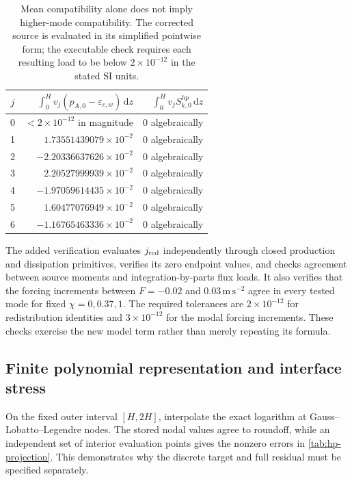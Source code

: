\documentclass[11pt,a4paper]{article}
\numberwithin{equation}{section}
\newcommand{\dd}{\mathrm{d}}
\newcommand{\eps}{\varepsilon}
\newcommand{\units}[1]{\,\mathrm{#1}}
\newcommand{\ECw}{\eps_{c,w}}
\begin{document}
\begin{table}[htbp]
\centering\small
\begin{tabular}{@{}crr@{}}
\toprule
$j$ & $\int_0^H v_j(p_{A,0}-\ECw)\,\dd z$
& $\int_0^H v_j S_{k,0}^{hp}\,\dd z$\\
\midrule
0 & $<2\times10^{-12}$ in magnitude & $0$ algebraically\\
1 & $ 1.73551439079\times10^{-2}$ & $0$ algebraically\\
2 & $-2.20336637626\times10^{-2}$ & $0$ algebraically\\
3 & $ 2.20527999939\times10^{-2}$ & $0$ algebraically\\
4 & $-1.97059614435\times10^{-2}$ & $0$ algebraically\\
5 & $ 1.60477076949\times10^{-2}$ & $0$ algebraically\\
6 & $-1.16765463336\times10^{-2}$ & $0$ algebraically\\
\bottomrule
\end{tabular}
\caption{Mean compatibility alone does not imply higher-mode compatibility.
The corrected source is evaluated in its simplified pointwise form;
the executable check requires each resulting load to be below
$2\times10^{-12}$ in the stated SI units.}
\label{tab:hp-moments}
\end{table}

The added verification evaluates $j_{\rm red}$ independently through
closed production and dissipation primitives, verifies its zero
endpoint values, and checks agreement between source moments and
integration-by-parts flux loads. It also verifies that the forcing
increments between $F=-0.02$ and $0.03\units{m\,s^{-2}}$ agree in
every tested mode for fixed $\chi=0,0.37,1$. The required tolerances
are $2\times10^{-12}$ for redistribution identities and
$3\times10^{-12}$ for the modal forcing increments. These checks
exercise the new model term rather than merely repeating its formula.

\subsection{Finite polynomial representation and interface stress}
On the fixed outer interval $[H,2H]$, interpolate the exact logarithm
at Gauss--Lobatto--Legendre nodes. The stored nodal values agree to
roundoff, while an independent set of interior evaluation points gives
the nonzero errors in \cref{tab:hp-projection}. This demonstrates why
the discrete target and full residual must be specified separately.
\end{document}
